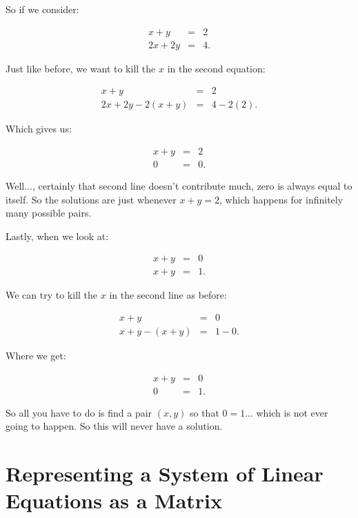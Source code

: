 \begin{example} So if we consider:

\begin{eqnarray*}
x+y&=&2\\
2x+2y&=&4.
\end{eqnarray*}

Just like before, we want to kill the $x$ in the second equation:

\begin{eqnarray*}
x+y&=&2\\
2x+2y-2(x+y)&=&4-2(2).
\end{eqnarray*}

Which gives us:

\begin{eqnarray*}
x+y&=&2\\
0&=&0.
\end{eqnarray*}

Well..., certainly that second line doesn't contribute much, zero is always equal to itself.  So the solutions are just whenever $x+y=2$, which happens for infinitely many possible pairs.


\end{example}

\begin{example}


 Lastly, when we look at:

\begin{eqnarray*}
x+y&=&0\\
x+y&=&1.
\end{eqnarray*}

We can try to kill the $x$ in the second line as before:

\begin{eqnarray*}
x+y&=&0\\
x+y-(x+y)&=&1-0.
\end{eqnarray*}

Where we get:

\begin{eqnarray*}
x+y&=&0\\
0&=&1.
\end{eqnarray*}

So all you have to do is find a pair $(x,y)$ so that $0=1$... which is not ever going to happen.  So this will never have a solution.


\end{example}



\section{Representing a System of Linear Equations as a Matrix}

